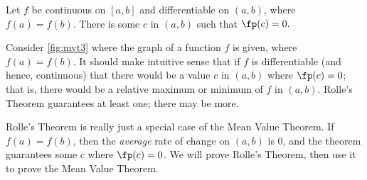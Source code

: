 \begin{theorem}\label{thm:rolles}
Let $f$ be continuous on $[a,b]$ and differentiable on $(a,b)$, where $f(a) = f(b)$. There is some $c$ in $(a,b)$ such that $\fp(c) = 0.$
\end{theorem}


Consider \autoref{fig:mvt3} where the graph of a function $f$ is given, where $f(a) = f(b)$. It should make intuitive sense that if $f$ is differentiable (and hence, continuous) that there would be a value $c$ in $(a,b)$ where $\fp(c)=0$; that is, there would be a relative maximum or minimum of $f$ in $(a,b)$. Rolle's Theorem guarantees at least one; there may be more. 

Rolle's Theorem is really just a special case of the Mean Value Theorem. If $f(a) = f(b)$, then the \emph{average} rate of change on $(a,b)$ is $0$, and the theorem guarantees some $c$ where $\fp(c)=0$. We will prove Rolle's Theorem, then use it to prove the Mean Value Theorem.

